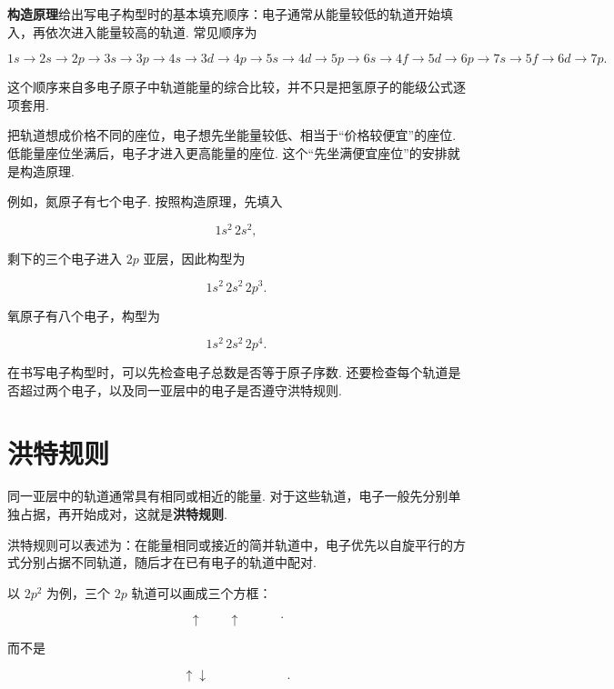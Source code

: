\documentclass[UTF8,11pt,a4paper,openany]{ctexbook}
\newcommand{\term}[1]{\textbf{#1}}
\begin{document}
\term{构造原理}给出写电子构型时的基本填充顺序：电子通常从能量较低的轨道开始填入，再依次进入能量较高的轨道. 常见顺序为

\[
1s
\longrightarrow
2s
\longrightarrow
2p
\longrightarrow
3s
\longrightarrow
3p
\longrightarrow
4s
\longrightarrow
3d
\longrightarrow
4p
\longrightarrow
5s
\longrightarrow
4d
\longrightarrow
5p
\longrightarrow
6s
\longrightarrow
4f
\longrightarrow
5d
\longrightarrow
6p
\longrightarrow
7s
\longrightarrow
5f
\longrightarrow
6d
\longrightarrow
7p.
\]

这个顺序来自多电子原子中轨道能量的综合比较，并不只是把氢原子的能级公式逐项套用. 

\begin{analogybox}
把轨道想成价格不同的座位，电子想先坐能量较低、相当于“价格较便宜”的座位. 低能量座位坐满后，电子才进入更高能量的座位. 这个“先坐满便宜座位”的安排就是构造原理. 
\end{analogybox}

例如，氮原子有七个电子. 按照构造原理，先填入

\[
1s^2\,2s^2,
\]

剩下的三个电子进入 $2p$ 亚层，因此构型为

\[
1s^2\,2s^2\,2p^3.
\]

氧原子有八个电子，构型为

\[
1s^2\,2s^2\,2p^4.
\]

在书写电子构型时，可以先检查电子总数是否等于原子序数. 还要检查每个轨道是否超过两个电子，以及同一亚层中的电子是否遵守洪特规则. 

\section{洪特规则}

同一亚层中的轨道通常具有相同或相近的能量. 对于这些轨道，电子一般先分别单独占据，再开始成对，这就是\term{洪特规则}. 

\begin{definitionbox}
洪特规则可以表述为：在能量相同或接近的简并轨道中，电子优先以自旋平行的方式分别占据不同轨道，随后才在已有电子的轨道中配对. 
\end{definitionbox}

以 $2p^2$ 为例，三个 $2p$ 轨道可以画成三个方框：

\[
\boxed{\uparrow}\qquad
\boxed{\uparrow}\qquad
\boxed{\phantom{\uparrow}}.
\]

而不是

\[
\boxed{\uparrow\downarrow}\qquad
\boxed{\phantom{\uparrow}}\qquad
\boxed{\phantom{\uparrow}}.
\]
\end{document}

